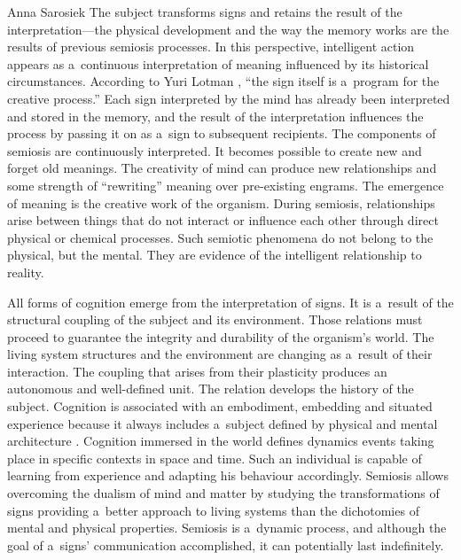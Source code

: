 \begin{artengenv}{Anna Sarosiek}
The subject transforms signs and retains the result of the interpretation---the physical development and the way the memory works are the results of previous semiosis processes. In this perspective, intelligent action appears as a~continuous interpretation of meaning influenced by its historical circumstances. According to Yuri Lotman
\parencite*[][p.101]{lotman_universe_1990}, %
 ``the sign itself is a~program for the creative process.'' Each sign interpreted by the mind has already been interpreted and stored in the memory, and the result of the interpretation influences the process by passing it on as a~sign to subsequent recipients. The components of semiosis are continuously interpreted. It becomes possible to create new and forget old meanings. The creativity of mind can produce new relationships and some strength of ``rewriting'' meaning over pre-existing engrams. The emergence of meaning is the creative work of the organism. During semiosis, relationships arise between things that do not interact or influence each other through direct physical or chemical processes. Such semiotic phenomena do not belong to the physical, but the mental. They are evidence of the intelligent relationship to reality.

All forms of cognition emerge from the interpretation of signs. It is a~result of the structural coupling of the subject and its environment. Those relations must proceed to guarantee the integrity and durability of the organism’s world. The living system structures and the environment are changing as a~result of their interaction. The coupling that arises from their plasticity produces an autonomous and well-defined unit. The relation develops the history of the subject. Cognition is associated with an embodiment, embedding and situated experience because it always includes a~subject defined by physical and mental architecture
\parencites[][]{wilson_embodied_2013}[][]{lakoff_metaphors_2008}[][]{miles_moving_2010}. %
 Cognition immersed in the world defines dynamics events taking place in specific contexts in space and time. Such an individual is capable of learning from experience and adapting his behaviour accordingly. Semiosis allows overcoming the dualism of mind and matter by studying the transformations of signs providing a~better approach to living systems than the dichotomies of mental and physical properties. Semiosis is a~dynamic process, and although the goal of a~signs’ communication accomplished, it can potentially last indefinitely.


\end{artengenv}
